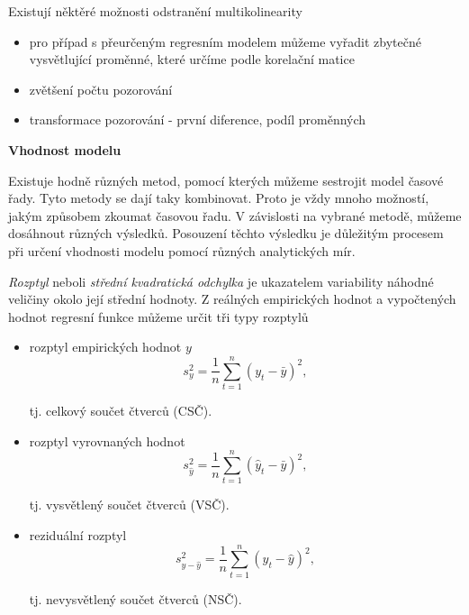 \documentclass[a4paper,12pt,twoside]{scrreprt}
\begin{document}
Existují něktěré možnosti odstranění multikolinearity

\begin{itemize}
\item pro případ s přeurčeným regresním modelem můžeme vyřadit zbytečné vysvětlující proměnné, které určíme podle korelační matice  
\item zvětšení počtu pozorování
\item transformace pozorování - první diference, podíl proměnných
\end{itemize}

\normalsize\textbf{\newline Vhodnost modelu}  

Existuje hodně různých metod, pomocí kterých můžeme sestrojit model časové řady. Tyto metody se dají taky kombinovat. Proto je vždy mnoho možností, jakým způsobem zkoumat časovou řadu. V závislosti na vybrané metodě, můžeme dosáhnout různých výsledků. Posouzení těchto výsledku je důležitým procesem při určení vhodnosti modelu pomocí různých analytických mír.

\textit{Rozptyl} neboli \textit{střední kvadratická odchylka} je ukazatelem variability náhodné veličiny okolo její střední hodnoty. Z reálných empirických hodnot a vypočtených hodnot regresní funkce můžeme určit tři typy rozptylů

\begin{itemize}
\item rozptyl empirických hodnot $y$
\begin{equation}
s^{2}_y = \frac{1}{n}\sum_{t=1}^{n}(y_t - \bar{y})^2,
\end{equation}

tj. celkový součet čtverců (CSČ).

\item rozptyl vyrovnaných hodnot
\begin{equation}
s^{2}_{\hat{y}} = \frac{1}{n}\sum_{t=1}^{n}(\hat{y}_t - \bar{y})^2,
\end{equation}

tj. vysvětlený součet čtverců (VSČ).

\item reziduální rozptyl
\begin{equation}
s^{2}_{y-\hat{y}} = \frac{1}{n}\sum_{t=1}^{n}(y_t - \hat{y})^2,
\end{equation}

tj. nevysvětlený součet čtverců (NSČ).
\end{itemize}
\end{document}
